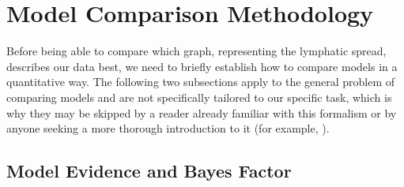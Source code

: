 \documentclass[\relativeRoot/main.tex]{subfiles}
\begin{document}
\section{Model Comparison Methodology}
\label{sec:graph:model_comp}

Before being able to compare which graph, representing the lymphatic spread, describes our data best, we need to briefly establish how to compare models in a quantitative way. The following two subsections apply to the general problem of comparing models and are not specifically tailored to our specific task, which is why they may be skipped by a reader already familiar with this formalism or by anyone seeking a more thorough introduction to it (for example, ).

\subsection*{Model Evidence and Bayes Factor}
\label{subsec:graph:model_comp:evidence}
\end{document}
